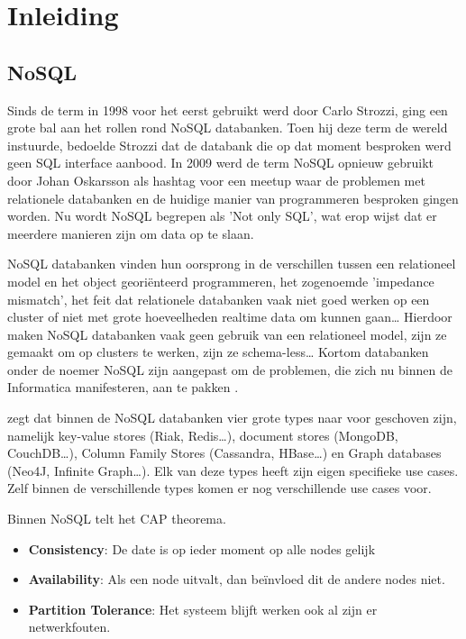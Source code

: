 \chapter{Inleiding}
\label{ch:inleiding}

\section{NoSQL}
Sinds de term in 1998 voor het eerst gebruikt werd door Carlo Strozzi, ging een grote bal aan het rollen rond NoSQL databanken.
Toen hij deze term de wereld instuurde, bedoelde Strozzi dat de databank die op dat moment besproken werd geen SQL interface aanbood.
In 2009 werd de term NoSQL opnieuw gebruikt door Johan Oskarsson als hashtag voor een meetup waar de problemen met relationele databanken en de huidige manier van programmeren besproken gingen worden.
Nu wordt NoSQL begrepen als 'Not only SQL', wat erop wijst dat er meerdere manieren zijn om data op te slaan. \citep{Fowler2013Introduction}

NoSQL databanken vinden hun oorsprong in de verschillen tussen een relationeel model en het object georiënteerd programmeren, het zogenoemde 'impedance mismatch', het feit dat relationele databanken vaak niet goed werken op een cluster of niet met grote hoeveelheden realtime data om kunnen gaan\dots
Hierdoor maken NoSQL databanken vaak geen gebruik van een relationeel model, zijn ze gemaakt om op clusters te werken, zijn ze schema-less\dots
Kortom databanken onder de noemer NoSQL zijn aangepast om de problemen, die zich nu binnen de Informatica manifesteren, aan te pakken \citep{Fowler2012NoSQLDef}.

\cite{Sadalage2014OverviewNoSQL} zegt dat binnen de NoSQL databanken vier grote types naar voor geschoven zijn, namelijk key-value stores (Riak, Redis\dots), document stores (MongoDB, CouchDB\dots), Column Family Stores (Cassandra, HBase\dots) en Graph databases (Neo4J, Infinite Graph\dots).
Elk van deze types heeft zijn eigen specifieke use cases.
Zelf binnen de verschillende types komen er nog verschillende use cases voor.

Binnen NoSQL telt het CAP theorema.
\begin{itemize}
	\item \textbf{Consistency}: De date is op ieder moment op alle nodes gelijk
	\item \textbf{Availability}: Als een node uitvalt, dan beïnvloed dit de andere nodes niet.
	\item \textbf{Partition Tolerance}: Het systeem blijft werken ook al zijn er netwerkfouten.
\end{itemize}

